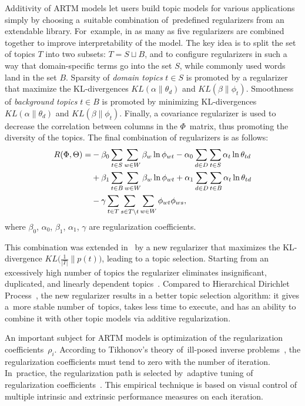 \documentclass{acm_proc_article-sp}
\begin{document}
Additivity of ARTM models let users build topic models for various applications
simply by choosing a~suitable combination of~predefined regularizers
from an extendable \mbox{library}.
%
For~example,
in \cite{voron14mlj} as many as five regularizers are combined together to improve interpretability of the model.
The key idea is to split the set of topics $T$ into two subsets: ${T = S \sqcup B}$,
and to configure regularizers in such a way that
domain-specific terms go into the set $S$,
while commonly used words land in the set $B$.
Sparsity of \emph{domain topics} $t \in S$ is promoted by a regularizer that maximize the KL-divergences
$KL(\alpha\|\theta_d)$ and
$KL(\beta\|\phi_t)$.
Smoothness of \emph{background topics} $t \in B$ is promoted by minimizing KL-divergences
$KL(\alpha\|\theta_d)$ and
$KL(\beta\|\phi_t)$.
Finally, a covariance regularizer is used to
decrease the correlation between columns in the $\Phi$~matrix, thus promoting the diversity of the topics.
The final combination of regularizers is as follows:
\begin{align*}
    R(\Phi,\Theta)
    =&
    - \beta_0 \sum_{t\in S} \sum_{w\in W} \beta_w \ln \phi_{wt}
    - \alpha_0 \sum_{d\in D} \sum_{t\in S} \alpha_t \ln \theta_{td}
    \notag
\\  {}&
    + \beta_1 \sum_{t\in B} \sum_{w\in W} \beta_w \ln \phi_{wt}
    + \alpha_1 \sum_{d\in D} \sum_{t\in B} \alpha_t \ln \theta_{td}
\\  {}&
    - \gamma
        \sum_{t\in T}
        \sum_{s\in T\backslash t}
        \sum_{w\in W} \phi_{wt}\phi_{ws},
\end{align*}
where $\beta_0$, $\alpha_0$, $\beta_1$, $\alpha_1$, $\gamma$
are regularization coefficients.

This combination was extended in~\cite{voron14aist} by a new regularizer that maximizes the KL-divergence
$KL\bigl( \frac1{|T|}\|p(t) \bigr)$,
leading to a topic selection.
Starting from an excessively high number of topics
the regularizer eliminates insignificant, duplicated, and linearly dependent topics~\cite{voron15slds}.
Compared to Hierarchical Dirichlet Process~\cite{teh06hierarchical}, the new regularizer results in a better topic selection algorithm:
it gives a~more stable number of~topics, takes less time to execute,
and has an ability to combine it with other topic models via additive regularization.

An important subject for ARTM models is optimization of the regularization coefficients~$\rho_i$.
According to Tikhonov's theory of~ill-posed inverse problems~\cite{tihonov77methods-eng},
the regularization coefficients must tend to zero with the number of iteration.
In~practice,
the regularization path is selected
by~adaptive tuning of regularization coefficients~\cite{voron14mlj,voron14aist,voron15slds}.
This empirical technique is based on visual control of
multiple intrinsic and extrinsic performance measures
on each iteration.
\end{document}
